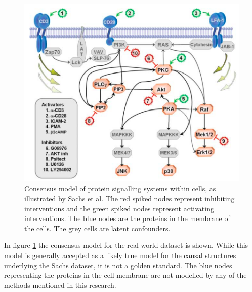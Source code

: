 \documentclass[a4paper,pdf]{article}
\begin{document}
\begin{figure}[!ht]
    \centering
    \includegraphics[width=\textwidth]{sachs}
    \caption{Consensus model of protein signalling systems within cells, as illustrated by  Sachs et al. \cite[p.~525]{sachs2005causal} The red spiked nodes represent inhibiting interventions and the green spiked nodes represent activating interventions. The blue nodes are the proteins in the membrane of the cells. The grey cells are latent confounders. }
    \label{fig:sachs}
\end{figure}

In figure \ref{fig:sachs} the consensus model for the real-world dataset is shown. While this model is generally accepted as a likely true model for the causal structures underlying the Sachs dataset, it is not a golden standard. The blue nodes representing the proteins in the cell membrane are not modelled by any of the methods mentioned in this research.
\end{document}
